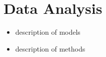 \section{Data Analysis} \label{sec:analysis}
    \begin{itemize}
        \item description of models
        \item description of methods
    \end{itemize}